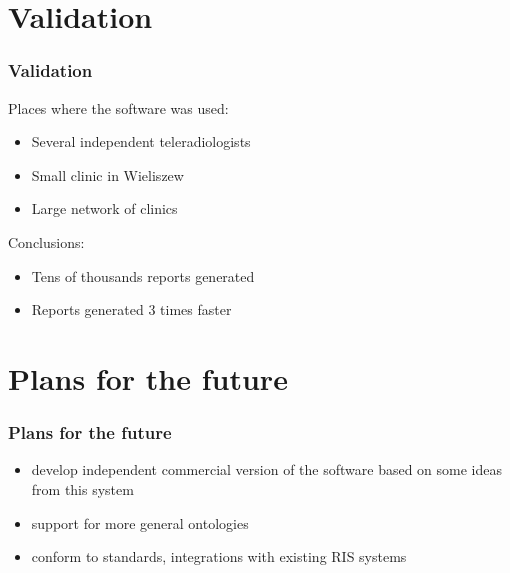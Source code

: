 \documentclass{beamer}
\begin{document}
\section {Validation}
\begin{frame}
\frametitle{Validation}
Places where the software was used:
\begin{itemize}
	\item Several independent teleradiologists
	\item Small clinic in Wieliszew
	\item Large network of clinics
\end{itemize}

Conclusions:
\begin{itemize}
	\item Tens of thousands reports generated
	\item Reports generated 3 times faster
\end{itemize}
\end{frame}

\section {Plans for the future}
\begin{frame}
\frametitle{Plans for the future}
\begin{itemize}
	\item develop independent commercial version of the software based on some ideas from this system
	\item support for more general ontologies
	\item conform to standards, integrations with existing RIS systems
\end{itemize}
\end{frame}
\end{document}
